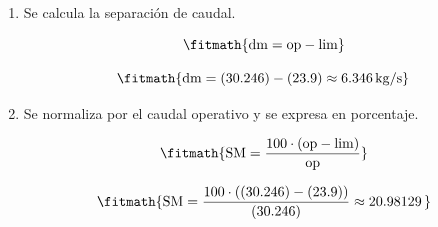 \begin{enumerate}

\item Se calcula la separación de caudal.

\[\fitmath{\mathrm{dm}=\mathrm{op}-\mathrm{lim}}\]

\[\fitmath{\mathrm{dm}=(30.246)-(23.9)\approx 6.346\,\mathrm{kg/s}}\]

\item Se normaliza por el caudal operativo y se expresa en porcentaje.

\[\fitmath{\mathrm{SM}=\frac{100\cdot \left(\mathrm{op}-\mathrm{lim}\right)}{\mathrm{op}}}\]

\[\fitmath{\mathrm{SM}=\frac{100\cdot \left((30.246)-(23.9)\right)}{(30.246)}\approx 20.98129\,}\]

\end{enumerate}
